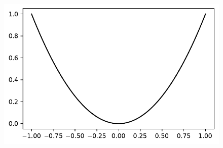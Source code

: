 \documentclass[
  letterpaper,
  DIV=11,
  numbers=noendperiod]{scrreprt}
\begin{document}
\begin{figure}[H]

{\centering \includegraphics{99_spot_doc_files/figure-pdf/cell-4-output-1.pdf}

}

\end{figure}
\end{document}
